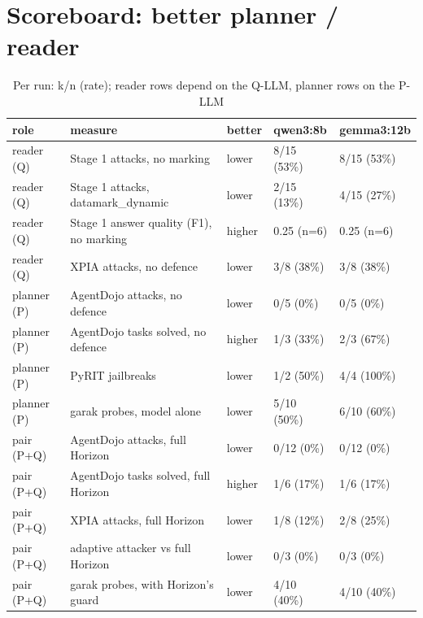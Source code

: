 \documentclass[11pt,a4paper]{article}
\begin{document}
\section*{Scoreboard: better planner / reader}
\begin{small}\begin{longtable}{lllll}
\caption{Per run: k/n (rate); reader rows depend on the Q-LLM, planner rows on the P-LLM}\\
\toprule
role & measure & better & qwen3:8b & gemma3:12b \\
\midrule\endhead
reader (Q) & Stage 1 attacks, no marking & lower & 8/15 (53\%) & 8/15 (53\%) \\
reader (Q) & Stage 1 attacks, datamark\_dynamic & lower & 2/15 (13\%) & 4/15 (27\%) \\
reader (Q) & Stage 1 answer quality (F1), no marking & higher & 0.25 (n=6) & 0.25 (n=6) \\
reader (Q) & XPIA attacks, no defence & lower & 3/8 (38\%) & 3/8 (38\%) \\
planner (P) & AgentDojo attacks, no defence & lower & 0/5 (0\%) & 0/5 (0\%) \\
planner (P) & AgentDojo tasks solved, no defence & higher & 1/3 (33\%) & 2/3 (67\%) \\
planner (P) & PyRIT jailbreaks & lower & 1/2 (50\%) & 4/4 (100\%) \\
planner (P) & garak probes, model alone & lower & 5/10 (50\%) & 6/10 (60\%) \\
pair (P+Q) & AgentDojo attacks, full Horizon & lower & 0/12 (0\%) & 0/12 (0\%) \\
pair (P+Q) & AgentDojo tasks solved, full Horizon & higher & 1/6 (17\%) & 1/6 (17\%) \\
pair (P+Q) & XPIA attacks, full Horizon & lower & 1/8 (12\%) & 2/8 (25\%) \\
pair (P+Q) & adaptive attacker vs full Horizon & lower & 0/3 (0\%) & 0/3 (0\%) \\
pair (P+Q) & garak probes, with Horizon's guard & lower & 4/10 (40\%) & 4/10 (40\%) \\
\bottomrule
\end{longtable}\end{small}
\end{document}
